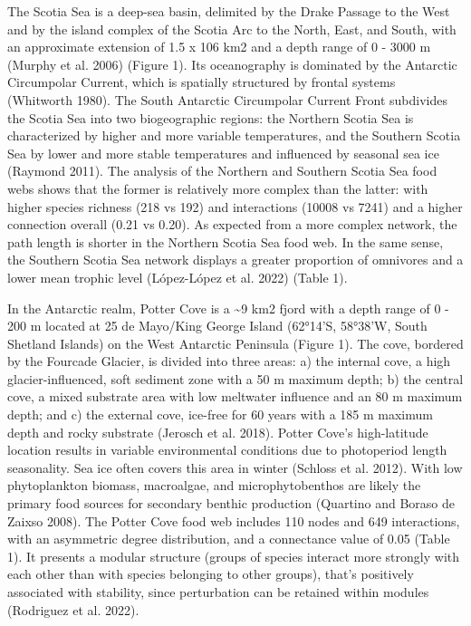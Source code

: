 \documentclass[
]{article}
\begin{document}
The Scotia Sea is a deep-sea basin, delimited by the Drake Passage to
the West and by the island complex of the Scotia Arc to the North, East,
and South, with an approximate extension of 1.5 x 106 km2 and a depth
range of 0 - 3000 m (Murphy et al. 2006) (Figure 1). Its oceanography is
dominated by the Antarctic Circumpolar Current, which is spatially
structured by frontal systems (Whitworth 1980). The South Antarctic
Circumpolar Current Front subdivides the Scotia Sea into two
biogeographic regions: the Northern Scotia Sea is characterized by
higher and more variable temperatures, and the Southern Scotia Sea by
lower and more stable temperatures and influenced by seasonal sea ice
(Raymond 2011). The analysis of the Northern and Southern Scotia Sea
food webs shows that the former is relatively more complex than the
latter: with higher species richness (218 vs 192) and interactions
(10008 vs 7241) and a higher connection overall (0.21 vs 0.20). As
expected from a more complex network, the path length is shorter in the
Northern Scotia Sea food web. In the same sense, the Southern Scotia Sea
network displays a greater proportion of omnivores and a lower mean
trophic level (López-López et al. 2022) (Table 1).

In the Antarctic realm, Potter Cove is a \textasciitilde9 km2 fjord with
a depth range of 0 - 200 m located at 25 de Mayo/King George Island
(62°14'S, 58°38'W, South Shetland Islands) on the West Antarctic
Peninsula (Figure 1). The cove, bordered by the Fourcade Glacier, is
divided into three areas: a) the internal cove, a high
glacier-influenced, soft sediment zone with a 50 m maximum depth; b) the
central cove, a mixed substrate area with low meltwater influence and an
80 m maximum depth; and c) the external cove, ice-free for 60 years with
a 185 m maximum depth and rocky substrate (Jerosch et al. 2018). Potter
Cove's high-latitude location results in variable environmental
conditions due to photoperiod length seasonality. Sea ice often covers
this area in winter (Schloss et al. 2012). With low phytoplankton
biomass, macroalgae, and microphytobenthos are likely the primary food
sources for secondary benthic production (Quartino and Boraso de Zaixso
2008). The Potter Cove food web includes 110 nodes and 649 interactions,
with an asymmetric degree distribution, and a connectance value of 0.05
(Table 1). It presents a modular structure (groups of species interact
more strongly with each other than with species belonging to other
groups), that's positively associated with stability, since perturbation
can be retained within modules (Rodriguez et al. 2022).
\end{document}
